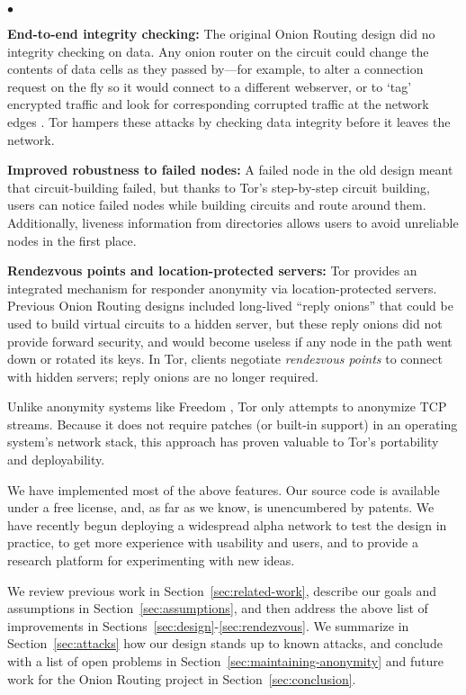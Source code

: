 \documentclass[times,10pt,twocolumn]{article}
\newenvironment{tightlist}{\begin{list}{$\bullet$}{
  \setlength{\itemsep}{0mm}
    \setlength{\parsep}{0mm}
    }}{\end{list}}
\begin{document}
\begin{tightlist}
\item \textbf{End-to-end integrity checking:} The original Onion Routing
design did no integrity checking on data. Any onion router on the
circuit could change the contents of data cells as they passed by---for
example, to alter a connection request on the fly so it would connect
to a different webserver, or to `tag' encrypted traffic and look for
corresponding corrupted traffic at the network edges \cite{minion-design}.
Tor hampers these attacks by checking data integrity before it leaves
the network.

\item \textbf{Improved robustness to failed nodes:} A failed node
in the old design meant that circuit-building failed, but thanks to
Tor's step-by-step circuit building, users can notice failed nodes
while building circuits and route around them. Additionally, liveness
information from directories allows users to avoid unreliable nodes in
the first place.

\item \textbf{Rendezvous points and location-protected servers:}
Tor provides an integrated mechanism for responder anonymity via
location-protected servers.  Previous Onion Routing designs included
long-lived ``reply onions'' that could be used to build virtual circuits
to a hidden server, but these reply onions did not provide forward
security, and would become useless if any node in the path went down
or rotated its keys.  In Tor, clients negotiate {\it rendezvous points}
to connect with hidden servers; reply onions are no longer required.
\end{tightlist}

Unlike anonymity systems like Freedom \cite{freedom2-arch}, Tor only
attempts to anonymize TCP streams. Because it does not require patches
(or built-in support) in an operating system's network stack, this
approach has proven valuable to Tor's portability and deployability.

We have implemented most of the above features. Our source code is
available under a free license, and, as far as we know, is unencumbered by
patents. We have recently begun deploying a widespread alpha network
to test the design in practice, to get more experience with usability
and users, and to provide a research platform for experimenting with
new ideas.

We review previous work in Section~\ref{sec:related-work}, describe
our goals and assumptions in Section~\ref{sec:assumptions},
and then address the above list of improvements in
Sections~\ref{sec:design}-\ref{sec:rendezvous}. We summarize
in Section~\ref{sec:attacks} how our design stands up to
known attacks, and conclude with a list of open problems in
Section~\ref{sec:maintaining-anonymity} and future work for the Onion
Routing project in Section~\ref{sec:conclusion}.
\end{document}
